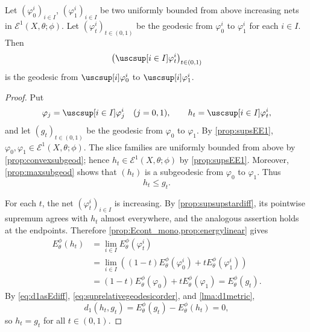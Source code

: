 \begin{proposition}\label{prop:supsgeod}
    Let $(\varphi^i_0)_{i\in I}$, $(\varphi^i_1)_{i\in I}$ be two uniformly bounded from above increasing nets in $\mathcal{E}^{1}(X,\theta;\phi)$. Let $(\varphi^i_t)_{t\in (0,1)}$ be the geodesic from $\varphi_0^i$ to $\varphi_1^i$ for each $i\in I$. Then
    \[
    \left(\uscsup[i\in I]\varphi^i_t\right)_{t\in (0,1)}
    \]
    is the geodesic from $\uscsup[i] \varphi^i_0$ to $\uscsup[i] \varphi^i_1$.
\end{proposition}
\begin{proof}
    Put
    \[
        \varphi_j=\uscsup[i\in I]\varphi_j^i\quad(j=0,1),
        \qquad h_t=\uscsup[i\in I]\varphi_t^i,
    \]
    and let $(g_t)_{t\in(0,1)}$ be the geodesic from $\varphi_0$ to $\varphi_1$. By \cref{prop:supsEE1}, $\varphi_0,\varphi_1\in\mathcal E^1(X,\theta;\phi)$. The slice families are uniformly bounded from above by \cref{prop:convexsubgeod}; hence $h_t\in\mathcal E^1(X,\theta;\phi)$ by \cref{prop:supsEE1}. Moreover, \cref{prop:maxsubgeod} shows that $(h_t)$ is a subgeodesic from $\varphi_0$ to $\varphi_1$. Thus
    \begin{equation}\label{eq:suprelativegeodesicorder}
        h_t\leq g_t.
    \end{equation}

    For each $t$, the net $(\varphi_t^i)_{i\in I}$ is increasing. By \cref{prop:supsupstardiff}, its pointwise supremum agrees with $h_t$ almost everywhere, and the analogous assertion holds at the endpoints. Therefore \cref{prop:Econt_mono,prop:energylinear} gives
    \[
        \begin{aligned}
        E_\theta^\phi(h_t)
        &=\lim_{i\in I}E_\theta^\phi(\varphi_t^i)\\
        &=\lim_{i\in I}\left((1-t)E_\theta^\phi(\varphi_0^i)
        +tE_\theta^\phi(\varphi_1^i)\right)\\
        &=(1-t)E_\theta^\phi(\varphi_0)+tE_\theta^\phi(\varphi_1)
        =E_\theta^\phi(g_t).
        \end{aligned}
    \]
    By \eqref{eq:d1asEdiff}, \eqref{eq:suprelativegeodesicorder}, and \cref{lma:d1metric},
    \[
        d_1(h_t,g_t)=E_\theta^\phi(g_t)-E_\theta^\phi(h_t)=0,
    \]
    so $h_t=g_t$ for all $t\in(0,1)$.
\end{proof}


